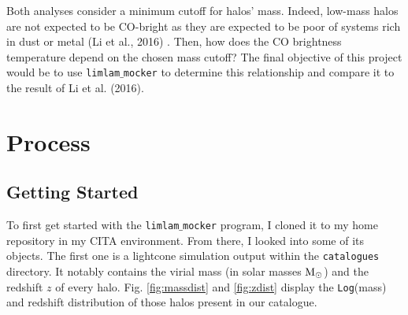 \documentclass[apj]{emulateapj}
\begin{document}
Both analyses consider a minimum cutoff for halos' mass. Indeed, low-mass halos are not expected to be CO-bright as they are expected to be poor of systems rich in dust or metal (Li et al., 2016) \cite{Li_2016}. Then, how does the CO brightness temperature depend on the chosen mass cutoff? The final objective of this project would be to use \texttt{limlam$\_$mocker} to determine this relationship and compare it to the result of Li et al. (2016). 


\section{Process}
\label{sec:process}
\subsection{Getting Started}
To first get started with the \texttt{limlam$\_$mocker} program, I cloned it to my home repository in my CITA environment. From there, I looked into some of its objects. The first one is a lightcone simulation output within the \texttt{catalogues} directory. It notably contains the virial mass (in solar masses $\rm{M_\odot}$) and the redshift $z$ of every halo. Fig. \ref{fig:massdist} and \ref{fig:zdist} display the \texttt{Log}(mass) and redshift distribution of those halos present in our catalogue.
\end{document}

